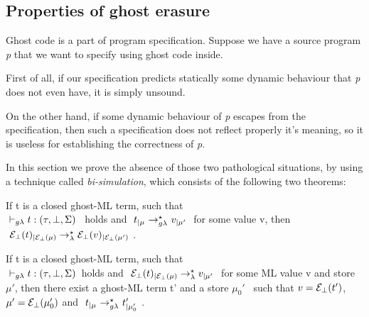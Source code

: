 \subsection{Properties of ghost erasure}

Ghost code is a part of program specification.
Suppose we have a source program \textit{p} that we want to specify using
ghost code inside.

First of all, if our specification predicts statically some dynamic 
behaviour that \textit{p} does not even have, it is simply unsound.

On the other hand, if some dynamic behaviour of \textit{p} 
escapes from the specification, then such a specification does not reflect 
properly it's meaning, so it is useless for establishing the correctness of \textit{p}.

In this section we prove the absence of those two pathological situations,
by using a technique called \textit{bi-simulation}, which consists of 
the following two theorems:

\begin{theorem}
If t is a closed ghost-ML term, such that\\ 
$\typrule{t}{\tau}{\bot}{\Sigma}$ ~holds and $~t_{|\mu} ~ {\rightarrow}^{\star}_{g\lambda} ~ v_{|\mu'}~$ 
for some value v, then\\ 
$~\mathcal{E}_{\bot}(t)_{|\mathcal{E}_{\bot}(\mu)} \rightarrow_{\lambda}^{\star} \mathcal{E}_{\bot}(v)_{|\mathcal{E}_{\bot}(\mu')} ~$.
\end{theorem}

\begin{theorem}
If t is a closed ghost-ML term, such that 
\\ $\typrule{t}{\tau}{\bot}{\Sigma}$~holds and 
$~\mathcal{E}_{\bot}(t)_{|\mathcal{E}_{\bot}(\mu)} \rightarrow_{\lambda}^{\star} v_{|\mu'} ~$ 
for some ML value v and store $\mu'$, 
then there exist a ghost-ML term t' and a store $\mu_{0}'$~
such that $v =\mathcal{E}_{\bot}(t')$, $\mu' = \mathcal{E}_{\bot}(\mu_{0}')$ and 
$~t{_{|\mu}} ~ {\rightarrow}^{\star}_{g\lambda} ~ t'_{|\mu_{0}'}~$.
\end{theorem}





%
%
%



